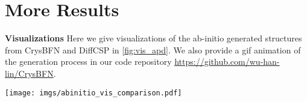 




\section{More Results}
\textbf{Visualizations} Here we give visualizations of the ab-initio generated structures from CrysBFN and DiffCSP in \cref{fig:vis_apd}. We also provide a gif animation of the generation process in our code repository \url{https://github.com/wu-han-lin/CrysBFN}.
\begin{figure*}[h!]
    \centering    \texttt{[image: imgs/abinitio\_vis\_comparison.pdf]}
    \caption{Visualizations comparison of the ab-initio generated structures from CrysBFN and DiffCSP.}
    \label{fig:vis_apd}
\end{figure*}



